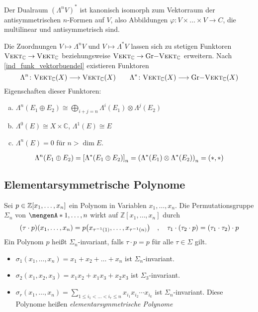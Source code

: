 Der Dualraum $(\Lambda^n V)^*$ ist kanonisch isomorph zum Vektorraum der antisymmetrischen $n$-Formen auf $V$, also Abbildungen $\varphi \colon V \times \ldots \times V \to C$, die multilinear und antisymmetrisch sind.

Die Zuordnungen $V \mapsto \Lambda^n V$ und $V \mapsto\Lambda^* V$ lassen sich zu stetigen Funktoren $\VEKT_\mathds{C} \to \VEKT_\mathds{C}$ beziehungsweise
$\VEKT_\mathds{C} \to \mathrm{Gr-}\VEKT_\mathds{C}$ erweitern. Nach \autoref{ind_funk_vektorbuendel} existieren Funktoren
\[
	\Lambda^n \colon \VEKT_\mathds{C}(X) \longrightarrow \VEKT_\mathds{C}(X) \qquad \Lambda^* \colon \VEKT_\mathds{C}(X) \longrightarrow \mathrm{Gr-}\VEKT_\mathds{C}(X)
\]
Eigenschaften dieser Funktoren: 
\begin{enumerate}[a)]
	\item $\Lambda^n(E_1 \oplus E_2) \cong \bigoplus_{i+j=n} \Lambda^i(E_1) \otimes \Lambda^j(E_2)$
	\item $\Lambda^0(E) \cong X \times \mathds{C}$, $\Lambda^1(E) \cong E$
	\item $\Lambda^n(E)=0$ für $n > \dim E$.
\end{enumerate}
\[
	\Lambda^n(E_1 \oplus E_2) = \benbrace*{\Lambda^*(E_1 \oplus E_2)}_n = \enbrace*{\Lambda^*(E_1) \otimes \Lambda^*(E_2)}_n= (*,*)  
\]

\subsection*{Elementarsymmetrische Polynome}
Sei $p \in \mathds{Z} \benbrace*{x_1, \ldots ,x_n}$ ein Polynom in Variablen $x_1, \ldots ,x_n$. Die Permutationsgruppe $\Sigma_n$ von $\set{1,\ldots ,n}$ wirkt auf $\mathds{Z}[x_1,\ldots ,x_n]$ durch
\[
	(\tau \cdot p)(x_1,\ldots ,x_n)=p \enbrace*{x_{\tau ^{-1}(1)}, \ldots , x_{\tau ^{-1}(n)}}  \quad , \quad \tau_1 \cdot (\tau_2 \cdot p) = (\tau_1 \cdot \tau_2) \cdot p
\]
Ein Polynom $p$ heißt $\Sigma_n$-invariant, falls $\tau \cdot p=p$ für alle $\tau \in \Sigma$ gilt.
\begin{beispiel}
\leavevmode
\begin{itemize}
	\item $\sigma_1(x_1,\ldots ,x_n)=x_1 +x_2 + \ldots + x_n$ ist $\Sigma_n$-invariant.
	\item $\sigma_2(x_1,x_2,x_3) = x_1 x_2 + x_1 x_3+ x_2 x_3$ ist $\Sigma_3$-invariant.
	\item $\sigma_r(x_1, \ldots ,x_n) = \sum_{1 \le i_1< \ldots < i_r \le n} x_{i_1} x_{i_2} \cdots x_{i_k}$ ist $\Sigma_n$-invariant. Diese Polynome heißen 
	\emph{elementarsymmetrische Polynome}
\end{itemize}
\end{beispiel}

